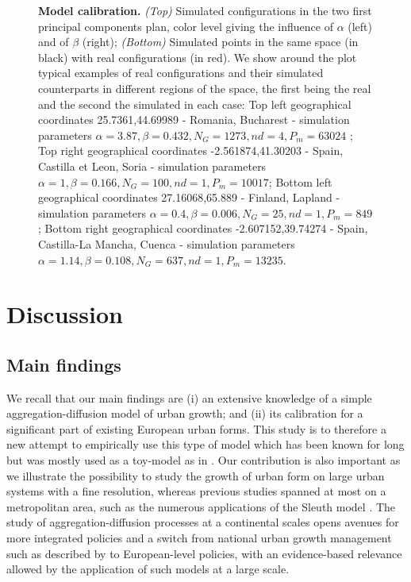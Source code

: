 \documentclass[10pt,letterpaper]{article}
\begin{document}
\begin{figure}[!h]
\caption{\textbf{Model calibration.} \textit{(Top)} Simulated configurations in the two first principal components plan, color level giving the influence of $\alpha$ (left) and of $\beta$ (right); \textit{(Bottom)} Simulated points in the same space (in black) with real configurations (in red). We show around the plot typical examples of real configurations and their simulated counterparts in different regions of the space, the first being the real and the second the simulated in each case: Top left geographical coordinates 25.7361,44.69989 - Romania, Bucharest - simulation parameters $\alpha=3.87,\beta=0.432,N_G=1273,nd=4,P_m=63024$ ; Top right geographical coordinates -2.561874,41.30203 - Spain, Castilla et Leon, Soria - simulation parameters $\alpha=1,\beta=0.166,N_G=100,nd=1,P_m=10017$; Bottom left geographical coordinates 27.16068,65.889 - Finland, Lapland - simulation parameters $\alpha=0.4,\beta=0.006,N_G=25,nd=1,P_m=849$; Bottom right geographical coordinates -2.607152,39.74274 - Spain, Castilla-La Mancha, Cuenca - simulation parameters $\alpha=1.14,\beta=0.108,N_G=637,nd=1,P_m=13235$.}
\label{fig:fig6}
\end{figure}







\section*{Discussion}


\subsection*{Main findings}

We recall that our main findings are (i) an extensive knowledge of a simple aggregation-diffusion model of urban growth; and (ii) its calibration for a significant part of existing European urban forms. This study is to therefore a new attempt to empirically use this type of model which has been known for long but was mostly used as a toy-model as in \cite{batty2006hierarchy}. Our contribution is also important as we illustrate the possibility to study the growth of urban form on large urban systems with a fine resolution, whereas previous studies spanned at most on a metropolitan area, such as the numerous applications of the Sleuth model \cite{clarke2007decade}. The study of aggregation-diffusion processes at a continental scales opens avenues for more integrated policies and a switch from national urban growth management such as described by \cite{frenkel2004potential} to European-level policies, with an evidence-based relevance allowed by the application of such models at a large scale.
\end{document}
